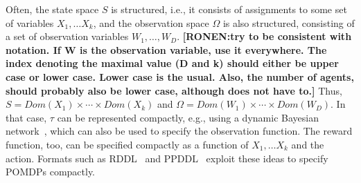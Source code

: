 \documentclass[letterpaper]{article} %
\newcommand{\ronen}[1]{\textbf{[\color{blue}RONEN:#1]}}
\newcommand{\guy}[1]{\textbf{[\color{orange}GUY:#1]}}
\begin{document}
Often, the state space $S$ is structured, i.e., it consists of assignments to some set of variables $X_1,\ldots X_k$, and the observation space $\Omega$ is
also structured, consisting of a set of observation variables $W_1,\ldots, W_D$. 
\ronen{try to be consistent with notation. If W is the observation variable, use it everywhere. The index denoting the maximal value (D and k) should
either be upper case or lower case. Lower case is the usual. Also, the number of agents, should probably also be lower case, although does not have to.}
Thus, $S=Dom(X_1)\times\cdots\times Dom(X_k)$ and
$\Omega = Dom(W_1)\times\cdots\times Dom(W_D)$. In that case, $\tau$ can be represented compactly, e.g., using a dynamic Bayesian network~\cite{},
which can also be used to specify the observation function. The reward function, too, can be specified compactly as a function of $X_1,\ldots X_k$ and
the action. Formats such as RDDL~\cite{} and PPDDL~\cite{} exploit these ideas to specify POMDPs compactly.
\end{document}
